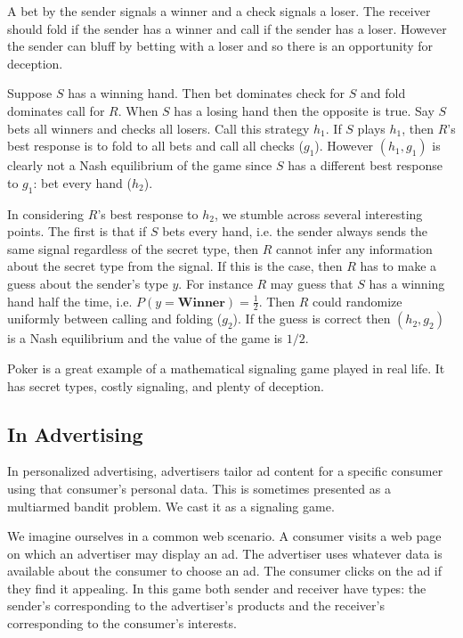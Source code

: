\documentclass{article}
\begin{document}
A bet by the sender signals a winner and a check signals a loser. The receiver should fold if the sender has a winner and call if the sender has a loser. However the sender can bluff by betting with a loser and so there is an opportunity for deception.

Suppose $S$ has a winning hand. Then bet dominates check for $S$ and fold dominates call for $R$. When $S$ has a losing hand then the opposite is true. Say $S$ bets all winners and checks all losers. Call this strategy $h_1$. If $S$ plays $h_1$, then $R$'s best response is to fold to all bets and call all checks ($g_1$). However $(h_1, g_1)$ is clearly not a Nash equilibrium of the game since $S$ has a different best response to $g_1$: bet every hand ($h_2$).

In considering $R$'s best response to $h_2$, we stumble across several interesting points. The first is that if $S$ bets every hand, i.e. the sender always sends the same signal regardless of the secret type, then $R$ cannot infer any information about the secret type from the signal. If this is the case, then $R$ has to make a guess about the sender's type $y$. For instance $R$ may guess that $S$ has a winning hand half the time, i.e. $P(y = \textbf{Winner}) = \frac{1}{2}$. Then $R$ could randomize uniformly between calling and folding ($g_2$). If the guess is correct then $(h_2, g_2)$ is a Nash equilibrium and the value of the game is $1/2$.

Poker is a great example of a mathematical signaling game played in real life. It has secret types, costly signaling, and plenty of deception.

\subsection{In Advertising}

In personalized advertising, advertisers tailor ad content for a specific consumer using that consumer's personal data. This is sometimes presented as a multiarmed bandit problem. We cast it as a signaling game.

We imagine ourselves in a common web scenario. A consumer visits a web page on which an advertiser may display an ad. The advertiser uses whatever data is available about the consumer to choose an ad. The consumer clicks on the ad if they find it appealing. In this game both sender and receiver have types: the sender's corresponding to the advertiser's products and the receiver's corresponding to the consumer's interests.
\end{document}
